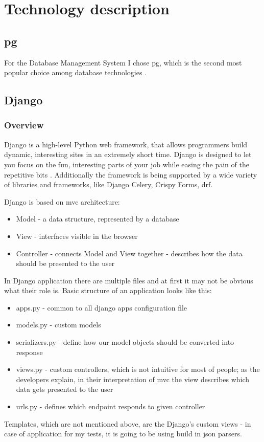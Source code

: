 
\chapter{Technology description}


\section{\acrlong{pg}}

For the Database Management System I chose \acrlong{pg}, which is the second most popular choice among database technologies \cite{devSurveyDb}.

\section{Django}

\subsection{Overview}
Django is a high-level Python web framework, that allows programmers build dynamic, interesting sites in an extremely short time. Django is designed to let you focus on the fun, interesting parts of your job while easing the pain of the repetitive bits \cite{djangobook}. Additionally the framework is being supported by a wide variety of libraries and frameworks, like Django Celery, Crispy Forms, \acrfull{drf}.

Django is based on \acrshort{mvc} architecture:
\begin{itemize}
  \item Model - a data structure, represented by a database
  \item View - interfaces visible in the browser
  \item Controller - connects Model and View together - describes how the data should be presented to the user
\end{itemize}
In Django application there are multiple files and at first it may not be obvious what their role is. Basic structure of an application looks like this:
\begin{itemize}
  \item apps.py - common to all django apps configuration file
  \item models.py - custom models
  \item serializers.py - define how our model objects should be converted into response
  \item views.py - custom controllers, which is not intuitive for most of people; as the developers explain, in their interpretation of \acrshort{mvc} the view describes which data gets presented to the user \cite{djangoWhyViews}
  \item urls.py - defines which endpoint responds to given controller
\end{itemize}
Templates, which are not mentioned above, are the Django's custom views - in case of application for my tests, it is going to be using build in json parsers.

